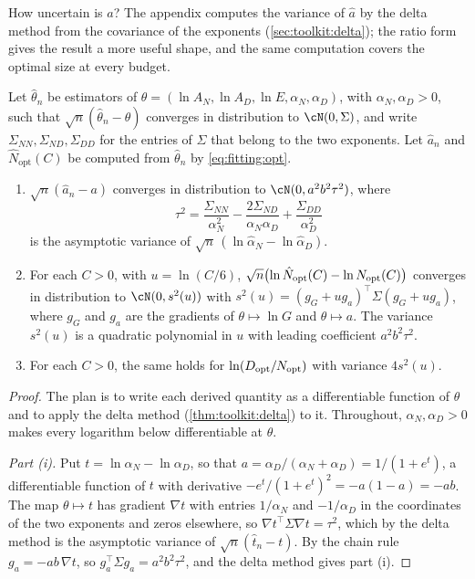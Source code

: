 \begin{refsection}
How uncertain is $a$? The appendix computes the variance of $\hat a$ by the delta method from the covariance of the exponents (\cref{sec:toolkit:delta}); the ratio form gives the result a more useful shape, and the same computation covers the optimal size at every budget.

\begin{proposition}\label{prop:fitting:delta}
Let $\hat\theta_n$ be estimators of $\theta=(\ln A_N,\ln A_D,\ln E,\alpha_N,\alpha_D)$, with $\alpha_N,\alpha_D>0$, such that $\sqrt n(\hat\theta_n-\theta)$ converges in distribution to $\cN(0,\Sigma)$, and write $\Sigma_{NN},\Sigma_{ND},\Sigma_{DD}$ for the entries of $\Sigma$ that belong to the two exponents. Let $\hat a_n$ and $\hat N_{\mathrm{opt}}(C)$ be computed from $\hat\theta_n$ by \eqref{eq:fitting:opt}.
\begin{enumerate}
\item $\sqrt n(\hat a_n-a)$ converges in distribution to $\cN(0,a^2b^2\tau^2)$, where
\[
\tau^2=\frac{\Sigma_{NN}}{\alpha_N^2}-\frac{2\Sigma_{ND}}{\alpha_N\alpha_D}+\frac{\Sigma_{DD}}{\alpha_D^2}
\]
is the asymptotic variance of $\sqrt n\,(\ln\hat\alpha_N-\ln\hat\alpha_D)$.
\item For each $C>0$, with $u=\ln(C/6)$, $\sqrt n\bigl(\ln\hat N_{\mathrm{opt}}(C)-\ln N_{\mathrm{opt}}(C)\bigr)$ converges in distribution to $\cN(0,s^2(u))$ with $s^2(u)=(g_G+ug_a)^\top\Sigma(g_G+ug_a)$, where $g_G$ and $g_a$ are the gradients of $\theta\mapsto\ln G$ and $\theta\mapsto a$. The variance $s^2(u)$ is a quadratic polynomial in $u$ with leading coefficient $a^2b^2\tau^2$.
\item For each $C>0$, the same holds for $\ln(D_{\mathrm{opt}}/N_{\mathrm{opt}})$ with variance $4s^2(u)$.
\end{enumerate}
\end{proposition}

\begin{proof}
The plan is to write each derived quantity as a differentiable function of $\theta$ and to apply the delta method (\cref{thm:toolkit:delta}) to it. Throughout, $\alpha_N,\alpha_D>0$ makes every logarithm below differentiable at $\theta$.

\emph{Part (i).} Put $t=\ln\alpha_N-\ln\alpha_D$, so that $a=\alpha_D/(\alpha_N+\alpha_D)=1/(1+e^{t})$, a differentiable function of $t$ with derivative $-e^t/(1+e^t)^2=-a(1-a)=-ab$. The map $\theta\mapsto t$ has gradient $\nabla t$ with entries $1/\alpha_N$ and $-1/\alpha_D$ in the coordinates of the two exponents and zeros elsewhere, so $\nabla t^\top\Sigma\nabla t=\tau^2$, which by the delta method is the asymptotic variance of $\sqrt n(\hat t_n-t)$. By the chain rule $g_a=-ab\,\nabla t$, so $g_a^\top\Sigma g_a=a^2b^2\tau^2$, and the delta method gives part (i).


\end{proof}
\end{refsection}
